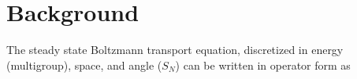 \documentclass{article}                                                                           %
\newcommand{\Sn}{\ensuremath{S_N}}
\newcommand{\Macro}{\ensuremath{\Sigma}}
\begin{document}
\section{Background}
\label{sec:background}
% 
%
The steady state Boltzmann transport equation, discretized in energy (multigroup), space, and angle ($S_N$) can be written in operator form as
\end{document}
